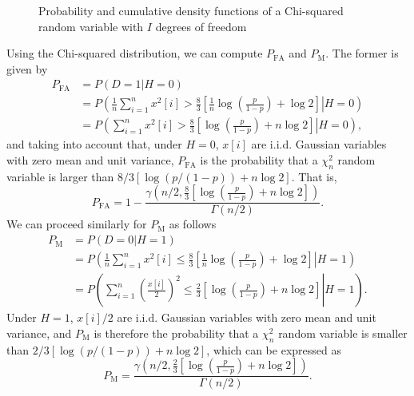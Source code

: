 \begin{figure}[t]
	\begin{center}
		 
	\end{center}
	\caption{Probability and cumulative density functions of a Chi-squared random variable with $I$ degrees of freedom}
	\label{fig:pdf_chi2}
\end{figure}

Using the Chi-squared distribution, we can compute $P_{\text{FA}}$ and $P_{\text{M}}$. The former is given by
\begin{align*}
	P_{\text{FA}} &= P(D = 1 | H = 0) \\ 
	&= P \left(\left. \frac{1}{n} \sum_{i = 1}^{n} x^2[i]  > \frac{8}{3} \left[ \frac{1}{n}  \log \left(\frac{p}{1 - p}  \right) + \log 2 \right] \right| H = 0 \right) \\ 
	&= P \left(\left. \sum_{i = 1}^{n} x^2[i]  > \frac{8}{3} \left[\log \left(\frac{p}{1 - p}  \right) + n \log 2 \right] \right| H = 0 \right),
\end{align*}
and taking into account that, under $H = 0$, $x[i]$ are i.i.d. Gaussian variables with zero mean and unit variance, $P_{\text{FA}}$ is the probability that a $\chi^2_n$ random variable is larger than $8/3 \left[\log \left(p/(1 - p)  \right) + n \log 2\right]$. That is,
\begin{equation*}
	P_{\text{FA}} = 1 - \frac{\gamma \left(n/2,\frac{8}{3} \left[\log \left(\frac{p}{1 - p}\right) + n \log 2 \right]\right)}{\Gamma(n/2)}.
\end{equation*}
We can proceed similarly for $P_{\text{M}}$ as follows
\begin{align*}
	P_{\text{M}} &= P(D = 0 | H = 1) \\ 
	&= P \left(\left. \frac{1}{n} \sum_{i = 1}^{n} x^2[i]  \leq \frac{8}{3} \left[ \frac{1}{n}  \log \left(\frac{p}{1 - p}  \right) + \log 2 \right] \right| H = 1 \right) \\ 
	&= P \left(\left. \sum_{i = 1}^{n} \left(\frac{x[i]}{2}\right)^2  \leq \frac{2}{3} \left[\log \left(\frac{p}{1 - p}  \right) + n \log 2 \right] \right| H = 1 \right).
\end{align*}
Under $H = 1$, $x[i]/2$ are i.i.d. Gaussian variables with zero mean and unit variance, and $P_{\text{M}}$ is therefore the probability that a $\chi^2_n$ random variable is smaller than $2/3 \left[\log \left(p/(1 - p)  \right) + n \log 2\right]$, which can be expressed as
\begin{equation*}
	P_{\text{M}} = \frac{\gamma \left(n/2,\frac{2}{3} \left[\log \left(\frac{p}{1 - p}  \right) + n \log 2 \right]\right)}{\Gamma(n/2)}.
\end{equation*}
